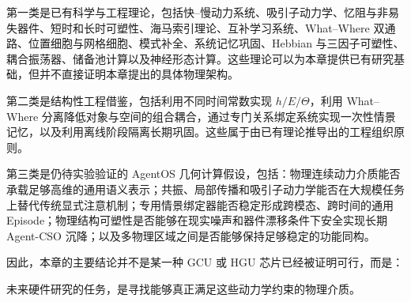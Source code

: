 第一类是已有科学与工程理论，包括快--慢动力系统、吸引子动力学、忆阻与非易失器件、短时和长时可塑性、海马索引理论、互补学习系统、What--Where 双通路、位置细胞与网格细胞、模式补全、系统记忆巩固、Hebbian 与三因子可塑性、耦合振荡器、储备池计算以及神经形态计算。这些理论可以为本章提供已有研究基础，但并不直接证明本章提出的具体物理架构。

第二类是结构性工程借鉴，包括利用不同时间常数实现 $h/E/\Theta$，利用 What--Where 分离降低对象与空间的组合耦合，通过专门关系绑定系统实现一次性情景记忆，以及利用离线阶段隔离长期巩固。这些属于由已有理论推导出的工程组织原则。

第三类是仍待实验验证的 AgentOS 几何计算假设，包括：物理连续动力介质能否承载足够高维的通用语义表示；共振、局部传播和吸引子动力学能否在大规模任务上替代传统显式注意机制；专用情景绑定器能否稳定形成跨模态、跨时间的通用 Episode；物理结构可塑性是否能够在现实噪声和器件漂移条件下安全实现长期 Agent-CSO 沉降；以及多物理区域之间是否能够保持足够稳定的功能同构。

因此，本章的主要结论并不是某一种 GCU 或 HGU 芯片已经被证明可行，而是：
\begin{statementbox}
\centering
{}
\end{statementbox}

未来硬件研究的任务，是寻找能够真正满足这些动力学约束的物理介质。
